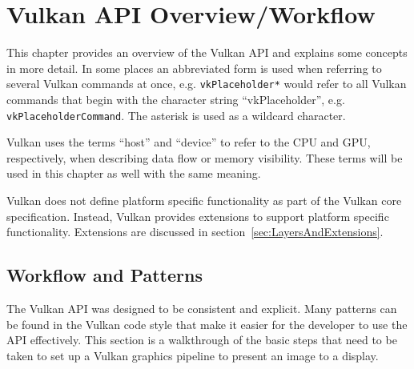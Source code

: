 
\chapter{Vulkan API Overview/Workflow}
\label{cha:VulkanOverview}

  This chapter provides an overview of the Vulkan API and explains some concepts in more detail. In some places an abbreviated form is used when referring to several Vulkan commands at once, e.g. \lstinline{vkPlaceholder*} would refer to all Vulkan commands that begin with the character string ``vkPlaceholder'', e.g. \lstinline{vkPlaceholderCommand}. The asterisk is used as a wildcard character.

  Vulkan uses the terms ``host'' and ``device'' to refer to the CPU and GPU, respectively, when describing data flow or memory visibility. These terms will be used in this chapter as well with the same meaning.

  Vulkan does not define platform specific functionality as part of the Vulkan core specification. Instead, Vulkan provides extensions to support platform specific functionality. Extensions are discussed in section~\ref{sec:LayersAndExtensions}.

  \section{Workflow and Patterns}
  \label{sec:WorkflowAndPatterns}
    The Vulkan API was designed to be consistent and explicit. Many patterns can be found in the Vulkan code style that make it easier for the developer to use the API effectively. This section is a walkthrough of the basic steps that need to be taken to set up a Vulkan graphics pipeline to present an image to a display.


